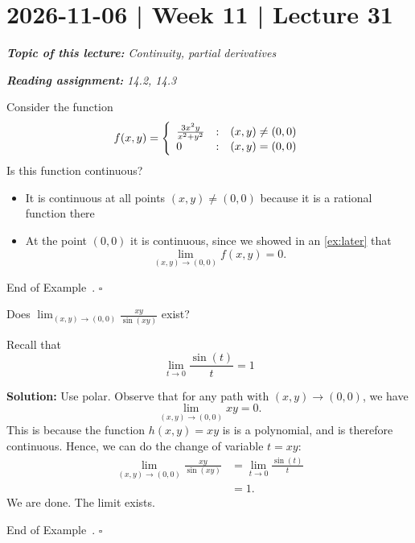 \documentclass[10pt]{article}
\theoremstyle{definition}
\newtheorem{example}[theorem]{Example}
\renewenvironment{example}
{\begin{oldexample}}
  {\par\smallskip\hfill   End of Example~\theexample. $\square$    \par\end{oldexample}}
\newcommand{\fl}{\noindent\textbf} %
\newcommand{\1}[1]{\textbf{1}_{\left[#1\right]}} %
\begin{document}
\section{2026-11-06 | Week 11 | Lecture 31}
\begin{center}
  \begin{tcolorbox}[width=0.9\textwidth, colback=white, colframe=black]
    \textit{\textbf{Topic of this lecture:} Continuity, partial derivatives}

    \textit{\textbf{Reading assignment:} 14.2, 14.3}
  \end{tcolorbox}
\end{center}
\begin{example}
  Consider the function
  \begin{equation*}
    f(x ,y) = \left\{ \begin{array}{l@{\quad:\quad}l} \frac{3x^{2}y}{x^{2}+y^{2}} & (x,y)\neq (0,0)\\
        0& (x,y) =(0,0)\end{array}\right.
  \end{equation*}
  Is this function continuous?
  \begin{itemize}
    \item It is continuous at all points $(x,y)\neq (0,0)$ because it is a
    rational function there
    \item At the point $(0,0)$ it is continuous, since we showed in an
    \cref{ex:later} that
    \begin{equation*}
      \lim_{(x,y)\to (0,0)}f(x,y) = 0.
    \end{equation*}
  \end{itemize}
\end{example}


\begin{example}
  Does $\lim_{(x,y)\to (0,0)} \frac{xy}{\sin(xy)}$ exist?

  Recall that
  \begin{equation*}
    \lim_{t \to 0} \frac{\sin(t)}{t} = 1
  \end{equation*}


  \fl{Solution:} Use polar. Observe that for any path with $(x,y)\to (0,0)$,
  we have
  \begin{equation*}
    \lim_{(x,y)\to (0,0)}xy = 0.
  \end{equation*}
  This is because the function $h(x,y) = xy$ is is a polynomial, and is
  therefore continuous. Hence, we can do the change of variable $t=xy$:
  \begin{align*}
    \lim_{(x,y)\to (0,0)} \frac{xy}{\sin(xy)}
    &= \lim_{t \to 0} \frac{\sin(t)}{t}\\
    &=1.
  \end{align*}
  We are done. The limit exists.
  
\end{example}
\end{document}
